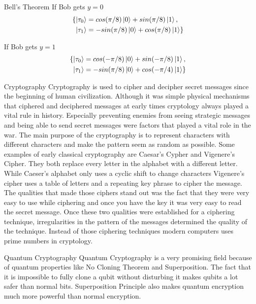 \documentclass[final, 20pt]{beamer}
\newlength{\onecolwid}
\newlength{\twocolwid}
\begin{document}
\begin{frame}[t]
\begin{columns}[t]
\begin{column}{\twocolwid}
\begin{columns}[t,totalwidth=\twocolwid]
\begin{column}{\onecolwid}
\begin{block}{Bell's Theorem}
If Bob gets $y=0$
\begin{align}
	\lbrace\ket{\tau_0} &= cos(\pi/8)\ket{0}
		+ sin(\pi/8)\ket{1},
	 \\ \ket{\tau_1} &= -sin(\pi/8)\ket{0}
		+ cos(\pi/8)\ket{1}\rbrace
\end{align}

If Bob gets $y=1$
\begin{align}
	\lbrace\ket{\tau_0} &= cos(-\pi/8)\ket{0}
		+ sin(-\pi/8)\ket{1},
	 \\ \ket{\tau_1} &= -sin(\pi/8)\ket{0}
		+ cos(-\pi/4)\ket{1}\rbrace
\end{align}

\end{block}

\begin{block}{Cryptography}
	Cryptography is used to cipher and decipher secret messages since the beginning of human civilization. Although it was simple physical mechanisms that ciphered and deciphered messages at early times cryptology always played a vital rule in history. Especially preventing enemies from seeing strategic messages and being able to send secret messages were factors that played a vital role in the war. The main purpose of the cryptography is to represent characters with different characters and make the pattern seem as random as possible. Some examples of early classical cryptography are Caesar's Cypher and Vigenere's Cipher. They both replace every letter in the alphabet with a different letter. While Caeser's alphabet only uses a cyclic shift to change characters Vigenere's cipher uses a table of letters and a repeating key phrase to cipher the message. The qualities that made those ciphers stand out was the fact that they were very easy to use while ciphering and once you have the key it was very easy to read the secret message. Once these two qualities were established for a ciphering technique, irregularities in the pattern of the messages determined the quality of the technique. Instead of those ciphering techniques modern computers uses prime numbers in cryptology.
\end{block}

\begin{block}{Quantum Cryptography}
Quantum Cryptography is a very promising field because of quantum properties like No Cloning Theorem and Superposition. The fact that it is impossible to fully clone a qubit without disturbing it makes qubits a lot safer than normal bits. Superposition Principle also makes quantum encryption much more powerful than normal encryption.
\end{block}


\end{column}
\end{columns}
\end{column}
\end{columns}
\end{frame}
\end{document}
